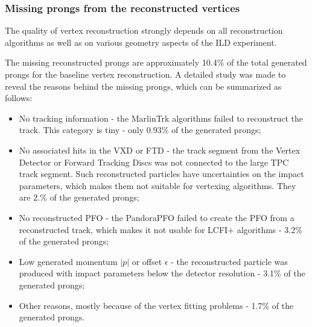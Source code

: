 \subsubsection{Missing prongs from the reconstructed vertices}
\label{sec:MissingProngs}
The quality of vertex reconstruction strongly depends on all reconstruction algorithms as well as on various geometry aspects of the ILD experiment. 

The missing reconstructed prongs are approximately 10.4\% of the total generated prongs for the baseline vertex reconstruction. 
A detailed study was made to reveal the reasons behind the missing prongs, which can be summarized as follows:
\begin{itemize}
\item No tracking information - the MarlinTrk algorithms failed to reconstruct the track. This category is tiny - only 0.93\% of the generated prongs;
\item No associated hits in the VXD or FTD - the track segment from the Vertex Detector or Forward Tracking Discs was not connected to the large TPC track segment. Such reconstructed particles have uncertainties on the impact parameters, which makes them not suitable for vertexing algorithms. They are 2.\% of the generated prongs;
\item No reconstructed PFO - the PandoraPFO failed to create the PFO from a reconstructed track, which makes it not usable for LCFI+ algorithms - 3.2\%  of the generated prongs;
\item Low generated momentum $|p|$ or offset $\epsilon$ - the reconstructed particle was produced with impact parameters below the detector resolution - 3.1\%  of the generated prongs;
\item Other reasons, mostly because of the vertex fitting problems - 1.7\% of the generated prongs.
\end{itemize}



